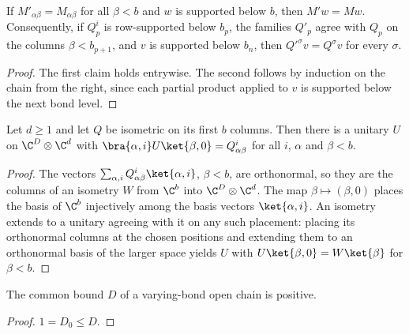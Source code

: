 \begin{lemma}
    \label{thm:seqanc_block_congr}
    \leanok
    If $M'_{\alpha\beta}=M_{\alpha\beta}$ for all $\beta<b$ and $w$ is
    supported below $b$, then $M'w=Mw$. Consequently, if $Q_p^i$ is
    row-supported below $b_p$, the families $Q'_p$ agree with $Q_p$ on the
    columns $\beta<b_{p+1}$, and $v$ is supported below $b_n$, then
    $Q'^\sigma v=Q^\sigma v$ for every $\sigma$.
\end{lemma}
\begin{proof}
    \leanok
    The first claim holds entrywise. The second follows by induction on the
    chain from the right, since each partial product applied to $v$ is
    supported below the next bond level.
\end{proof}

\begin{lemma}
    \label{thm:seqanc_unitary_extension}
    \leanok
    Let $d\ge 1$ and let $Q$ be isometric on its first $b$ columns. Then
    there is a unitary $U$ on $\C^D\otimes\C^d$ with
    $\bra{\alpha,i}U\ket{\beta,0}=Q^i_{\alpha\beta}$ for all $i$, $\alpha$
    and $\beta<b$.
\end{lemma}
\begin{proof}
    \leanok
    The vectors $\sum_{\alpha,i}Q^i_{\alpha\beta}\ket{\alpha,i}$, $\beta<b$,
    are orthonormal, so they are the columns of an isometry $W$ from $\C^b$
    into $\C^D\otimes\C^d$. The map $\beta\mapsto(\beta,0)$ places the
    basis of $\C^b$ injectively among the basis vectors $\ket{\alpha,i}$.
    An isometry extends to a unitary agreeing with it on any such placement:
    placing its orthonormal columns at the chosen positions and extending them to an
    orthonormal basis of the larger space yields $U$ with $U\ket{\beta,0}=W\ket{\beta}$ for $\beta<b$.
\end{proof}

\begin{lemma}
    \label{thm:seqanc_bond_bound_pos}
    \leanok
    The common bound $D$ of a varying-bond open chain is positive.
\end{lemma}
\begin{proof}
    \leanok
    $1=D_0\le D$.
\end{proof}

